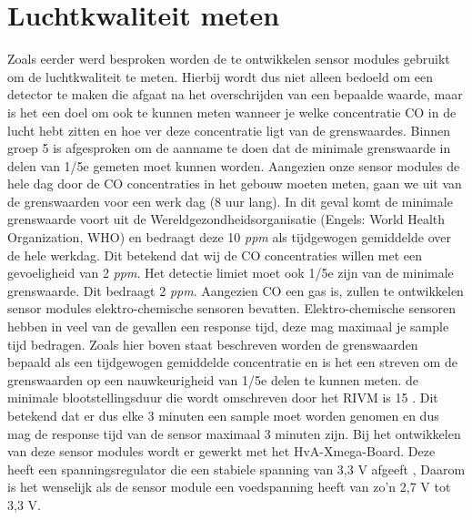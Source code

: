 \documentclass[a4paper, 11pt]{article} %
\begin{document}
\section{Luchtkwaliteit meten}
Zoals eerder werd besproken worden de te ontwikkelen sensor modules gebruikt om de luchtkwaliteit te meten. Hierbij wordt dus niet alleen bedoeld om een detector te maken die afgaat na het overschrijden van een bepaalde waarde, maar is het een doel om ook te kunnen meten wanneer je welke concentratie CO in de lucht hebt zitten en hoe ver deze concentratie ligt van de grenswaardes. Binnen groep 5 is afgesproken om de aanname te doen dat de minimale grenswaarde in delen van 1/5e gemeten moet kunnen worden. Aangezien onze sensor modules de hele dag door de CO concentraties in het gebouw moeten meten, gaan we uit van de grenswaarden voor een werk dag (8 uur lang). In dit geval komt de minimale grenswaarde voort uit de Wereldgezondheidsorganisatie (Engels: World Health Organization, WHO) en bedraagt deze 10 \textit{ppm} als tijdgewogen gemiddelde over de hele werkdag. Dit betekend dat wij de CO concentraties willen met een gevoeligheid van 2 \textit{ppm}. Het detectie limiet moet ook 1/5e zijn van de minimale grenswaarde. Dit bedraagt 2 \textit{ppm}. Aangezien CO een gas is, zullen te ontwikkelen sensor modules elektro-chemische sensoren bevatten. Elektro-chemische sensoren hebben in veel van de gevallen een response tijd, deze mag maximaal je sample tijd bedragen. Zoals hier boven staat beschreven worden de grenswaarden bepaald als een tijdgewogen gemiddelde concentratie en is het een streven om de grenswaarden op een nauwkeurigheid van 1/5e delen te kunnen meten. de minimale blootstellingsduur die wordt omschreven door het RIVM is 15 \cite{BlootstellingaanCO}. Dit betekend dat er dus elke 3 minuten een sample moet worden genomen en dus mag de response tijd van de sensor maximaal 3 minuten zijn. Bij het ontwikkelen van deze sensor modules wordt er gewerkt met het HvA-Xmega-Board. Deze heeft een spanningsregulator die een stabiele spanning van 3,3 V afgeeft \cite{xmega}, Daarom is het wenselijk als de sensor module een voedspanning heeft van zo'n 2,7 V tot 3,3 V.
\end{document}
